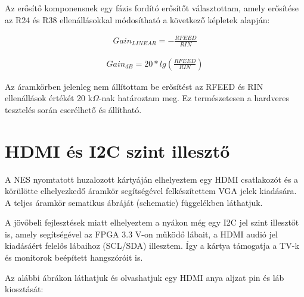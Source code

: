 	Az erősítő komponensnek egy fázis fordító erősítőt választottam, amely erősítése az R24 és R38 ellenállásokkal módosítható a következő képletek alapján:
	
	\begin{align}	
		Gain_{LINEAR} = -\frac{RFEED}{RIN}
	\end{align} 
	
	\begin{align}	
		Gain_{dB} = 20 * lg(\frac{RFEED}{RIN})
	\end{align}
 
	Az áramkörben jelenleg nem állítottam be erősítést az RFEED és RIN ellenállások értékét 20 k$\Omega$-nak határoztam meg. Ez természetesen a hardveres tesztelés során cserélhető és állítható.	
	
\section{HDMI és I2C szint illesztő}
	\label{sec:HMI-I2C}
	
	A NES nyomtatott huzalozott kártyáján elhelyeztem egy HDMI csatlakozót és a körülötte elhelyezkedő áramkör segítségével felkészítettem VGA jelek kiadására. A teljes áramkör sematikus ábráját (schematic)  függelékben láthatjuk.
	
	A jövőbeli fejlesztések miatt elhelyeztem a nyákon még egy I2C jel szint illesztőt is, amely segítségével az FPGA 3.3 V-on működő lábait, a HDMI audió jel kiadásáért felelős lábaihoz (SCL/SDA) illesztem. Így a kártya támogatja a TV-k és monitorok beépített hangszóróit is. 
	
	Az alábbi ábrákon láthatjuk és olvashatjuk egy HDMI anya aljzat pin és láb kiosztását:   
	
